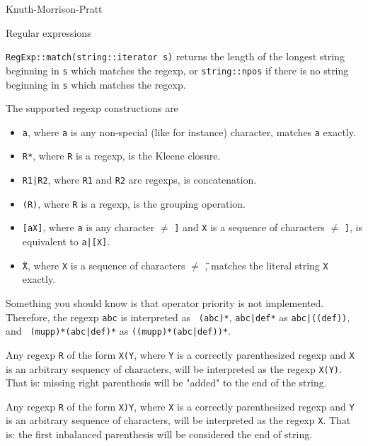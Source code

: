 
\begin{algorithm}{Knuth-Morrison-Pratt}
\end{algorithm}

\begin{algorithm}{Regular expressions}

\desc
{\tt RegExp::match(string::iterator s)} returns the length of the longest string beginning in {\tt s} which matches the regexp, or {\tt string::npos} if there is no string beginning in {\tt s} which matches the regexp.

The supported regexp constructions are
\begin{itemize}
 \item{{\tt a}}, where {\tt a} is any non-special (like {\tt *} for instance) character, matches {\tt a} exactly.
 \item{{\tt R*}}, where {\tt R} is a regexp, is the Kleene closure.
 \item{{\tt R1|R2}}, where {\tt R1} and {\tt R2} are regexps, is concatenation.
 \item{{\tt (R)}}, where {\tt R} is a regexp, is the grouping operation.
 \item{{\tt [aX]}}, where {\tt a} is any character $\neq$ {\tt ]} and {\tt X} is a sequence of characters $\neq$ {\tt ]}, is equivalent to {\tt a|[X]}.
 \item{{\tt \"{}X\"{}}}, where {\tt X} is a sequence of characters $\neq$ {\tt \"{}}, matches the literal string {\tt X} exactly.
\end{itemize}

Something you should know is that operator priority is not
implemented. Therefore, the regexp {\tt abc\*} is interpreted as {\tt
(abc)*}, {\tt abc|def*} as {\tt abc|((def)\*)}, and {\tt
(mupp)*(abc|def)*} as {\tt ((mupp)*(abc|def))*}.

Any regexp {\tt R} of the form {\tt X(Y}, where {\tt Y} is a correctly
parenthesized regexp and {\tt X} is an arbitrary sequency of characters,
will be interpreted as the regexp {\tt X(Y)}. That is: missing right
parenthesis will be "added" to the end of the string.

Any regexp {\tt R} of the form {\tt X)Y}, where {\tt X} is a correctly
parenthesized regexp and {\tt Y} is an arbitrary sequence of
characters, will be interpreted as the regexp {\tt X}. That is: the
first inbalanced parenthesis will be considered the end of string.

\end{algorithm}
